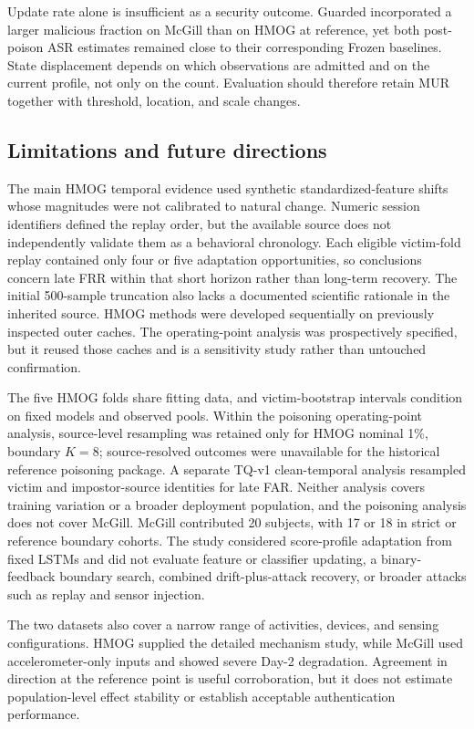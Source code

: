 \documentclass[technologies,article,submit,moreauthors]{Definitions/mdpi}
\begin{document}
Update rate alone is insufficient as a security outcome. Guarded incorporated a larger malicious fraction on McGill than on HMOG at reference, yet both post-poison ASR estimates remained close to their corresponding Frozen baselines. State displacement depends on which observations are admitted and on the current profile, not only on the count. Evaluation should therefore retain MUR together with threshold, location, and scale changes.

\subsection{Limitations and future directions}\label{sec:limitations-and-future-directions}

The main HMOG temporal evidence used synthetic standardized-feature shifts whose magnitudes were not calibrated to natural change. Numeric session identifiers defined the replay order, but the available source does not independently validate them as a behavioral chronology. Each eligible victim-fold replay contained only four or five adaptation opportunities, so conclusions concern late FRR within that short horizon rather than long-term recovery. The initial 500-sample truncation also lacks a documented scientific rationale in the inherited source. HMOG methods were developed sequentially on previously inspected outer caches. The operating-point analysis was prospectively specified, but it reused those caches and is a sensitivity study rather than untouched confirmation.

The five HMOG folds share fitting data, and victim-bootstrap intervals condition on fixed models and observed pools. Within the poisoning operating-point analysis, source-level resampling was retained only for HMOG nominal 1\%, boundary \(K=8\); source-resolved outcomes were unavailable for the historical reference poisoning package. A separate TQ-v1 clean-temporal analysis resampled victim and impostor-source identities for late FAR. Neither analysis covers training variation or a broader deployment population, and the poisoning analysis does not cover McGill. McGill contributed 20 subjects, with 17 or 18 in strict or reference boundary cohorts. The study considered score-profile adaptation from fixed LSTMs and did not evaluate feature or classifier updating, a binary-feedback boundary search, combined drift-plus-attack recovery, or broader attacks such as replay and sensor injection.

The two datasets also cover a narrow range of activities, devices, and sensing configurations. HMOG supplied the detailed mechanism study, while McGill used accelerometer-only inputs and showed severe Day-2 degradation. Agreement in direction at the reference point is useful corroboration, but it does not estimate population-level effect stability or establish acceptable authentication performance.
\end{document}
